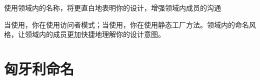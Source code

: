 \begin{content}
\begin{regulation}
使用领域内的名称，将更直白地表明你的设计，增强领域内成员的沟通
\end{regulation}

\begin{enum}
\end{enum}

当使用，你在使用访问者模式；当使用，你在使用静态工厂方法。领域内的命名风格，让领域内的成员更加快捷地理解你的设计意图。

\end{content}

\section{匈牙利命名}
